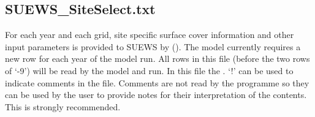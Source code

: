 \documentclass[letterpaper,10pt,english]{sphinxmanual}
\begin{document}
\subsection{SUEWS\_SiteSelect.txt}
\label{\detokenize{input_files/SUEWS_SiteInfo/SUEWS_SiteSelect::doc}}\label{\detokenize{input_files/SUEWS_SiteInfo/SUEWS_SiteSelect:suews-siteselect-txt}}\label{\detokenize{input_files/SUEWS_SiteInfo/SUEWS_SiteSelect:id1}}
For each year and each grid, site specific surface cover information and
other input parameters is provided to SUEWS by {\hyperref[\detokenize{input_files/SUEWS_SiteInfo/SUEWS_SiteSelect:suews-siteselect-txt}]{}} ().
The model currently requires a new row for each year of the model run.
All rows in this file (before the two rows of ‘-9’) will be read by the
model and run. In this file the . ‘!’ can
be used to indicate comments in the file. Comments are not read by the
programme so they can be used by the user to provide notes for their
interpretation of the contents. This is strongly recommended.
\end{document}

